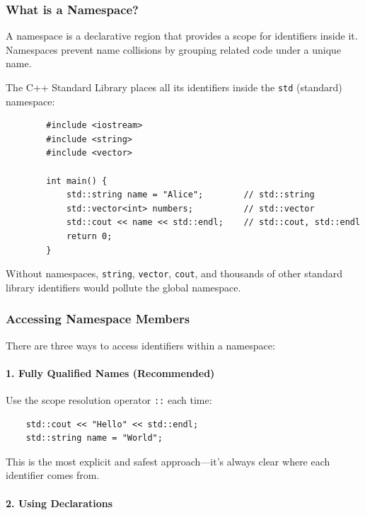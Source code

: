 \subsubsection{What is a Namespace?}

A namespace is a declarative region that provides a scope for identifiers inside it. Namespaces prevent name collisions by grouping related code under a unique name.

\begin{example}{\leavevmode}
	
	The C++ Standard Library places all its identifiers inside the \texttt{std} (standard) namespace:
	
	\begin{lstlisting}
		#include <iostream>
		#include <string>
		#include <vector>
		
		int main() {
			std::string name = "Alice";        // std::string
			std::vector<int> numbers;          // std::vector
			std::cout << name << std::endl;    // std::cout, std::endl
			return 0;
		}
	\end{lstlisting}
	
	Without namespaces, \texttt{string}, \texttt{vector}, \texttt{cout}, and thousands of other standard library identifiers would pollute the global namespace.
\end{example}

\subsubsection{Accessing Namespace Members}

There are three ways to access identifiers within a namespace:

\paragraph{1. Fully Qualified Names (Recommended)}

Use the scope resolution operator \texttt{::} each time:

\begin{lstlisting}
	std::cout << "Hello" << std::endl;
	std::string name = "World";
\end{lstlisting}

This is the most explicit and safest approach—it's always clear where each identifier comes from.

\paragraph{2. Using Declarations}

